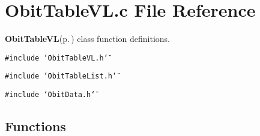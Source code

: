 \section{Obit\-Table\-VL.c File Reference}
\label{ObitTableVL_8c}
{\bf Obit\-Table\-VL}{\rm (p.\,\pageref{structObitTableVL})} class function definitions. 

{\tt \#include \char`\"{}Obit\-Table\-VL.h\char`\"{}}\par
{\tt \#include \char`\"{}Obit\-Table\-List.h\char`\"{}}\par
{\tt \#include \char`\"{}Obit\-Data.h\char`\"{}}\par
\subsection*{Functions}
